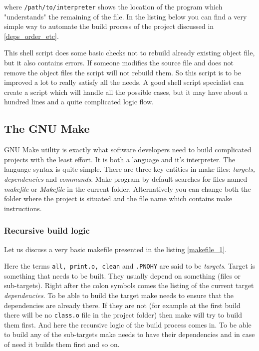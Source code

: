 where {\tt /path/to/interpreter} shows the location of the program which "understands" the remaining of the file. In the listing below you can find a very simple way to automate the build process of the project discussed in \ref{deps_order_etc}.



This shell script does some basic checks not to rebuild already existing object file, but it also contains errors. If someone modifies the source file and does not remove the object files the script will not rebuild them. So this script is to be improved a lot to really satisfy all the needs. A good shell script specialist can create a script which will handle all the possible cases, but it may have about a hundred lines and a quite complicated logic flow.

\subsection{The GNU Make}
GNU Make utility is exactly what software developers need to build complicated projects with the least effort. It is both a language and it's interpreter. The language syntax is quite simple. There are three key entities in make files: \textit {targets, dependencies} and \textit {commands}. Make program by default searches for files named \textit {makefile} or \textit {Makefile} in the current folder. Alternatively you can change both the folder where the project is situated and the file name which contains make instructions.

\subsubsection{Recursive build logic}
Let us discuss a very basic makefile presented in the listing \ref{makefile_1}.


Here the terms {\tt all, print.o, clean} and {\tt .PNOHY} are said to be \textit {targets}. Target is something that needs to be built. They usually depend on something (files or sub-targets). Right after the colon symbols comes the listing of the current target \textit{dependencies}. To be able to build the target make needs to ensure that the dependencies are already there. If they are not (for example at the first build there will be no {\tt class.o} file in the project folder) then make will try to build them first. And here the recursive logic of the build process comes in. To be able to build any of the sub-targets make needs to have their dependencies and in case of need it builds them first and so on.

